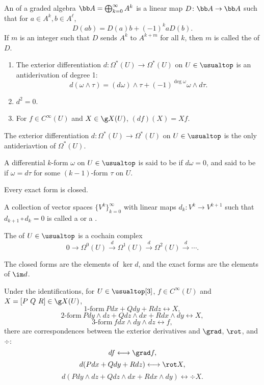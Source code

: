 An  of a graded algebra $\bb A = \bigoplus_{k=0}^\infty A^k$ is a linear map $D \colon \bb A \to \bb A$ such that for $a \in A^k, b \in A^\ell$,
\[
D(ab) = D(a)b + (-1)^k aD(b).
\]
If $m$ is an integer such that $D$ sends $A^k$ to $A^{k+m}$ for all $k$, then $m$ is called the  of $D$.

\begin{enumerate}
\item The exterior differentiation $d \colon \Omega^*(U) \to \Omega^*(U)$ on $U \in \usualtop$ is an antiderivation of degree 1:
\[
d(\omega \wedge \tau) = (d\omega)\wedge \tau + (-1)^{\deg \omega} \omega \wedge d \tau.
\]
\item $d^2 = 0$.
\item For $f \in C^\infty(U)$ and $X \in \g X(U)$, $(df)(X) = Xf$.
\end{enumerate}

The exterior differentiation $d \colon \Omega^*(U) \to \Omega^*(U)$ on $U \in \usualtop$ is the only antideriavtion of $\Omega^*(U)$.

A differential $k$-form $\omega$ on $U \in \usualtop$ is said to be  if $d\omega = 0$, and said to be  if $\omega = d \tau$ for some $(k-1)$-form $\tau$ on $U$.

Every exact form is closed.

A collection of vector spaces $\{ V^k \}_{k=0}^\infty$ with linear maps $d_k \colon V^k \to V^{k+1}$ such that $d_{k+1} \circ d_k = 0$ is called a  or a .

The  of $U \in \usualtop$ is a cochain complex
\[
0 \rightarrow \Omega^0 (U) \xrightarrow{d} \Omega^1(U) \xrightarrow{d} \Omega^2 (U) \xrightarrow{d} \cdots.
\]

The closed forms are the elements of $\ker d$, and the exact forms are the elements of $\im d$.

Under the identifications, for $U \in \usualtop[3]$, $f \in C^\infty(U)$ and $X = [P\ Q\ R] \in \g X(U)$,
\[
1\text{-form}\ Pdx + Qdy + Rdz \longleftrightarrow X,
\]
\[
2\text{-form}\ Pdy\wedge dz + Qdz\wedge dx + Rdx\wedge dy \longleftrightarrow X,
\]
\[
3\text{-form}\ f dx\wedge dy\wedge dz \longleftrightarrow f,
\]
there are correspondences between the exterior derivatives and $\grad$, $\rot$, and $\div$:
\[
df \longleftrightarrow \grad f,
\]
\[
d(Pdx + Qdy + Rdz) \longleftrightarrow \rot X,
\]
\[
d(Pdy\wedge dz + Qdz\wedge dx + Rdx\wedge dy) \longleftrightarrow \div X.
\]

